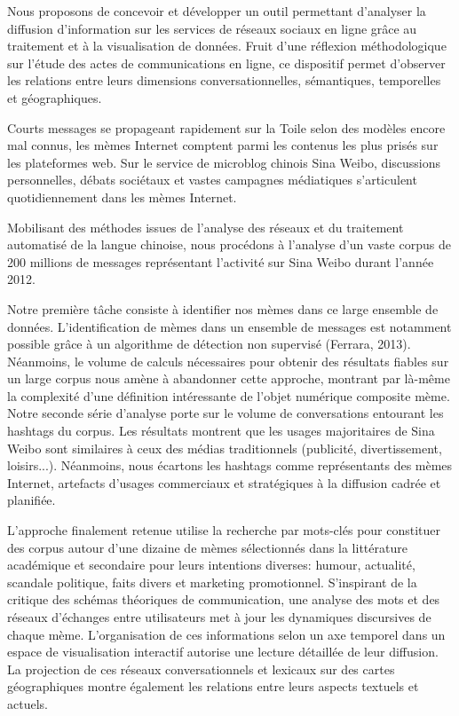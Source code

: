 
Nous proposons de concevoir et développer un outil permettant d’analyser la diffusion d’information sur les services de réseaux sociaux en ligne grâce au traitement et à la visualisation de données. Fruit d’une réflexion méthodologique sur l’étude des actes de communications en ligne, ce dispositif permet d’observer les relations entre leurs dimensions conversationnelles, sémantiques, temporelles et géographiques.

Courts messages se propageant rapidement sur la Toile selon des modèles encore mal connus, les mèmes Internet comptent parmi les contenus les plus prisés sur les plateformes web. Sur le service de microblog chinois Sina Weibo, discussions personnelles, débats sociétaux et vastes campagnes médiatiques s’articulent quotidiennement dans les mèmes Internet.

Mobilisant des méthodes issues de l’analyse des réseaux et du traitement automatisé de la langue chinoise, nous procédons à l’analyse d’un vaste corpus de 200 millions de messages représentant l’activité sur Sina Weibo durant l’année 2012. 

Notre première tâche consiste à identifier nos mèmes dans ce large ensemble de données. L’identification de mèmes dans un ensemble de messages est notamment possible grâce à un algorithme de détection non supervisé (Ferrara, 2013). Néanmoins, le volume de calculs nécessaires pour obtenir des résultats fiables sur un large corpus nous amène à abandonner cette approche, montrant par là-même la complexité d’une définition intéressante de l’objet numérique composite mème. Notre seconde série d’analyse porte sur le volume de conversations entourant les hashtags du corpus. Les résultats montrent que les usages majoritaires de Sina Weibo sont similaires à ceux des médias traditionnels (publicité, divertissement, loisirs...). Néanmoins, nous écartons les hashtags comme représentants des mèmes Internet, artefacts d’usages commerciaux et stratégiques à la diffusion cadrée et planifiée. 

L’approche finalement retenue utilise la recherche par mots-clés pour constituer des corpus autour d’une dizaine de mèmes sélectionnés dans la littérature académique et secondaire pour leurs intentions diverses: humour, actualité, scandale politique, faits divers et marketing promotionnel. S’inspirant de la critique des schémas théoriques de communication, une analyse des mots et des réseaux d’échanges entre utilisateurs met à jour les dynamiques discursives de chaque mème. L’organisation de ces informations selon un axe temporel dans un espace de visualisation interactif autorise une lecture détaillée de leur diffusion. La projection de ces réseaux conversationnels et lexicaux sur des cartes géographiques montre également les relations entre leurs aspects textuels et actuels.

